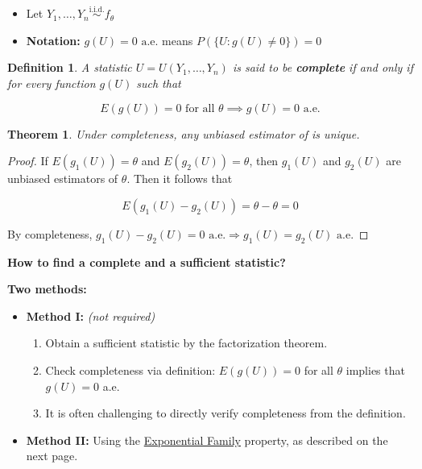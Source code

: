 \documentclass[a4paper,12pt]{article}
\theoremstyle{nonitalic}
\newtheorem{definition}{Definition}[subsection]
\newtheorem{theorem}{Theorem}[subsection]
\begin{document}
    \begin{itemize}
        \item Let \( Y_1, \ldots, Y_n \overset{\text{i.i.d.}}{\sim} f_\theta \)
        \item \textbf{Notation:} \( g(U) = 0 \text{ a.e.} \) means \( P(\{U : g(U) \neq 0\}) = 0 \)
    \end{itemize}
    
    \begin{definition}
    A statistic \( U = U(Y_1, \ldots, Y_n) \) is said to be \textbf{complete} if and only if for every function \( g(U) \) such that
    
    \[
        E(g(U)) = 0 \text{ for all } \theta \implies g(U) = 0 \text{ a.e.}
    \]
    \end{definition}
    
    \begin{theorem}
        Under completeness, any unbiased estimator of is unique.
    \end{theorem}

    \begin{proof}
        If \( E(g_1(U)) = \theta \) and \( E(g_2(U)) = \theta \), then \( g_1(U) \) and \( g_2(U) \) are unbiased estimators of \(\theta\). Then it follows that

        \[
            E(g_1(U) - g_2(U)) = \theta - \theta = 0
        \]

        By completeness, \(g_1(U) - g_2(U) = 0 \text{ a.e.} \Rightarrow g_1(U) = g_2(U) \text{ a.e.}\)
    \end{proof}

    \textbf{How to find a complete and a sufficient statistic?}

    \textbf{Two methods:}

    \begin{itemize}
        \item \textbf{Method I:} \textit{(not required)}
        \begin{enumerate}
            \item Obtain a sufficient statistic by the factorization theorem.
            \item Check completeness via definition: \(E(g(U)) = 0\) for all \(\theta\) implies that \(g(U) = 0\) a.e.
            \item It is often challenging to directly verify completeness from the definition.
        \end{enumerate}
        \item \textbf{Method II:} Using the \underline{Exponential Family} property, as described on the next page.
    \end{itemize}
\end{document}
